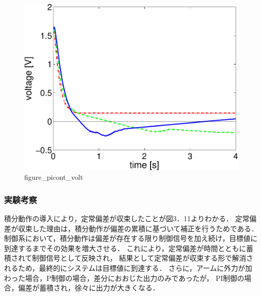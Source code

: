 \begin{figure}[h]
  \centering
  \includegraphics[scale=0.5]{sozai/figure_picont_volt-crop.pdf}
  \caption{figure\_picont\_volt}
\end{figure}

\newpage

\subsubsection{実験考察}
積分動作の導入により，定常偏差が収束したことが図3．11よりわかる．
定常偏差が収束した理由は，積分動作が偏差の累積に基づいて補正を行うためである．
制御系において，積分動作は偏差が存在する限り制御信号を加え続け，目標値に到達するまでその効果を増大させる．
これにより，定常偏差が時間とともに蓄積されて制御信号として反映され，
結果として定常偏差が収束する形で解消されるため，最終的にシステムは目標値に到達する．
さらに，アームに外力が加わった場合，P制御の場合，差分におおじた出力のみであったが，
PI制御の場合，偏差が蓄積され，徐々に出力が大きくなる．


